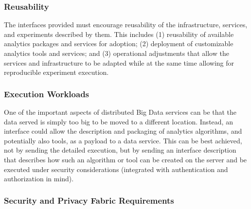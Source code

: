 \documentclass[9pt,]{article}
\begin{document}
\hypertarget{reusability}{%
\subsubsection{Reusability}\label{reusability}}

The interfaces provided must encourage reusability of the
infrastructure, services, and experiments described by them. This
includes (1) reusability of available analytics packages and services
for adoption; (2) deployment of customizable analytics tools and
services; and (3) operational adjustments that allow the services and
infrastructure to be adapted while at the same time allowing for
reproducible experiment execution.

\hypertarget{execution-workloads}{%
\subsubsection{Execution Workloads}\label{execution-workloads}}

One of the important aspects of distributed Big Data services can be
that the data served is simply too big to be moved to a different
location. Instead, an interface could allow the description and
packaging of analytics algorithms, and potentially also tools, as a
payload to a data service. This can be best achieved, not by sending the
detailed execution, but by sending an interface description that
describes how such an algorithm or tool can be created on the server and
be executed under security considerations (integrated with
authentication and authorization in mind).

\hypertarget{security-and-privacy-fabric-requirements}{%
\subsubsection{Security and Privacy Fabric
Requirements}\label{security-and-privacy-fabric-requirements}}
\end{document}
